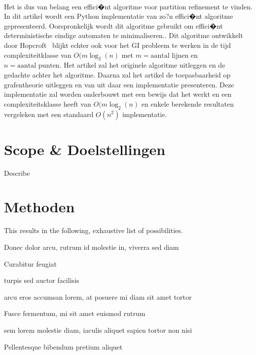 \documentclass[twoside]{article}
\begin{document}
\begin{multicols}{2}
\paragraph{} \noindent Het is dus van belang een effici�nt algoritme voor partition refinement te vinden.  In dit artikel wordt een Python implementatie van zo?n effici�nt algoritme gepresenteerd. Oorspronkelijk wordt dit algoritme gebruikt om effici�nt deterministische eindige automaten te minimaliseren.. Dit algoritme ontwikkelt door Hopcroft~\cite{MR0403320} blijkt echter ook voor het GI probleem te werken in de tijd complexiteitklasse van $O(m \log_{2} (n)$ met $m= \text{aantal lijnen}$ en $n = \text{aantal punten}$. Het artikel zal het originele algoritme uitleggen en de gedachte achter het algoritme. Daarna zal het artikel de toepasbaarheid op grafentheorie uitleggen en van uit daar een implementatie presenteren. Deze implementatie zal worden onderbouwt met een bewijs dat het werkt en een complexiteitsklasse heeft van  $O(m \log_{2} (n)$  en enkele berekende resultaten vergeleken met een standaard $O(n^2)$ implementatie.



\section{Scope \& Doelstellingen}

Describe \lipsum[1] %

\section{Methoden}
This results in the following, exhaustive list of possibilities. 
\begin{compactitem}
\item Donec dolor arcu, rutrum id molestie in, viverra sed diam
\item Curabitur feugiat
\item turpis sed auctor facilisis
\item arcu eros accumsan lorem, at posuere mi diam sit amet tortor
\item Fusce fermentum, mi sit amet euismod rutrum
\item sem lorem molestie diam, iaculis aliquet sapien tortor non nisi
\item Pellentesque bibendum pretium aliquet
\end{compactitem}
\lipsum[4] %


\end{multicols}
\end{document}
